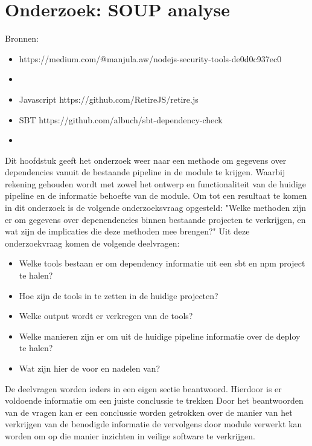 
\chapter{Onderzoek: SOUP analyse}\label{ch:onderzoek:-soup-analyse} %
Bronnen:

\begin{itemize}
    \item https://medium.com/@manjula.aw/nodejs-security-tools-de0d0c937ec0
    \item
\end{itemize}
\begin{itemize}
    \item Javascript     https://github.com/RetireJS/retire.js
    \item SBT https://github.com/albuch/sbt-dependency-check
    \item
\end{itemize}
Dit hoofdstuk geeft het onderzoek weer naar een methode om gegevens over dependencies vanuit de bestaande pipeline in de module te krijgen. Waarbij rekening gehouden wordt met zowel het ontwerp en functionaliteit van de huidige pipeline en de informatie behoefte van de module. Om tot een resultaat te komen in dit onderzoek is de volgende onderzoeksvraag opgesteld: "Welke methoden zijn er om gegevens over depenendencies binnen bestaande projecten te verkrijgen, en wat zijn de implicaties die deze methoden mee brengen?" Uit deze onderzoekvraag komen de volgende deelvragen:
\begin{itemize}
    \item Welke tools bestaan er om dependency informatie uit een sbt en npm project te halen?
    \item Hoe zijn de tools in te zetten in de huidige projecten?
    \item Welke output wordt er verkregen van de tools?
    \item Welke manieren zijn er om uit de huidige pipeline informatie over de deploy te halen?
    \item Wat zijn hier de voor en nadelen van?
\end{itemize}
De deelvragen worden ieders in een eigen sectie beantwoord. Hierdoor is er voldoende informatie om een juiste conclussie te trekken
Door het beantwoorden van de vragen kan er een conclussie worden getrokken over de manier van het verkrijgen van de benodigde informatie de vervolgens door module verwerkt kan worden om op die manier inzichten in veilige software te verkrijgen.



